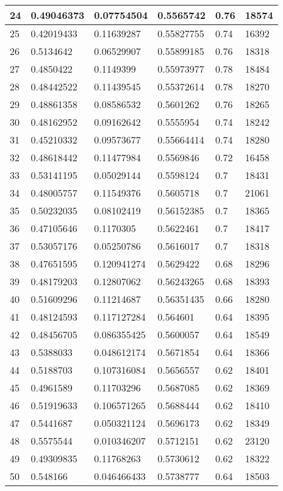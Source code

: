 \begin{longtable}{|l|l|l|l|l|l|}
24 & 0.49046373 & 0.07754504 & 0.5565742 & 0.76 & 18574 \\ \hline 
25 & 0.42019433 & 0.11639287 & 0.55827755 & 0.74 & 16392 \\ \hline 
26 & 0.5134642 & 0.06529907 & 0.55899185 & 0.76 & 18318 \\ \hline 
27 & 0.4850422 & 0.1149399 & 0.55973977 & 0.78 & 18484 \\ \hline 
28 & 0.48442522 & 0.11439545 & 0.55372614 & 0.78 & 18270 \\ \hline 
29 & 0.48861358 & 0.08586532 & 0.5601262 & 0.76 & 18265 \\ \hline 
30 & 0.48162952 & 0.09162642 & 0.5555954 & 0.74 & 18242 \\ \hline 
31 & 0.45210332 & 0.09573677 & 0.55664414 & 0.74 & 18280 \\ \hline 
32 & 0.48618442 & 0.11477984 & 0.5569846 & 0.72 & 16458 \\ \hline 
33 & 0.53141195 & 0.05029144 & 0.5598124 & 0.7 & 18431 \\ \hline 
34 & 0.48005757 & 0.11549376 & 0.5605718 & 0.7 & 21061 \\ \hline 
35 & 0.50232035 & 0.08102419 & 0.56152385 & 0.7 & 18365 \\ \hline 
36 & 0.47105646 & 0.1170305 & 0.5622461 & 0.7 & 18417 \\ \hline 
37 & 0.53057176 & 0.05250786 & 0.5616017 & 0.7 & 18318 \\ \hline 
38 & 0.47651595 & 0.120941274 & 0.5629422 & 0.68 & 18296 \\ \hline 
39 & 0.48179203 & 0.12807062 & 0.56243265 & 0.68 & 18393 \\ \hline 
40 & 0.51609296 & 0.11214687 & 0.56351435 & 0.66 & 18280 \\ \hline 
41 & 0.48124593 & 0.117127284 & 0.564601 & 0.64 & 18395 \\ \hline 
42 & 0.48456705 & 0.086355425 & 0.5600057 & 0.64 & 18549 \\ \hline 
43 & 0.5388033 & 0.048612174 & 0.5671854 & 0.64 & 18366 \\ \hline 
44 & 0.5188703 & 0.107316084 & 0.5656557 & 0.62 & 18401 \\ \hline 
45 & 0.4961589 & 0.11703296 & 0.5687085 & 0.62 & 18369 \\ \hline 
46 & 0.51919633 & 0.106571265 & 0.5688444 & 0.62 & 18410 \\ \hline 
47 & 0.5441687 & 0.050321124 & 0.5696173 & 0.62 & 18349 \\ \hline 
48 & 0.5575544 & 0.010346207 & 0.5712151 & 0.62 & 23120 \\ \hline 
49 & 0.49309835 & 0.11768263 & 0.5730612 & 0.62 & 18322 \\ \hline 
50 & 0.548166 & 0.046466433 & 0.5738777 & 0.64 & 18503 \\ \hline 
\end{longtable}